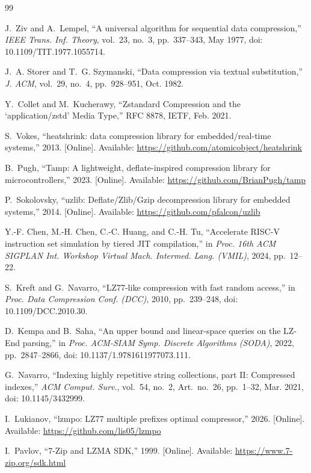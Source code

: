\documentclass[10pt,twocolumn]{article}
\begin{document}
\begin{thebibliography}{99}
\footnotesize
\setlength{\itemsep}{0pt}

J.~Ziv and A.~Lempel, ``A universal algorithm for sequential data compression,''
\emph{IEEE Trans. Inf. Theory}, vol.~23, no.~3, pp.~337--343, May 1977,
doi: 10.1109/TIT.1977.1055714.

J.~A. Storer and T.~G. Szymanski, ``Data compression via textual substitution,''
\emph{J. ACM}, vol.~29, no.~4, pp.~928--951, Oct. 1982.

Y.~Collet and M.~Kucherawy, ``Zstandard Compression and the `application/zstd'
Media Type,'' RFC 8878, IETF, Feb. 2021.

S.~Vokes, ``heatshrink: data compression library for embedded/real-time
systems,'' 2013. [Online]. Available:
\url{https://github.com/atomicobject/heatshrink}

B.~Pugh, ``Tamp: A lightweight, deflate-inspired compression library for
microcontrollers,'' 2023. [Online]. Available:
\url{https://github.com/BrianPugh/tamp}

P.~Sokolovsky, ``uzlib: Deflate/Zlib/Gzip decompression library for embedded
systems,'' 2014. [Online]. Available: \url{https://github.com/pfalcon/uzlib}

Y.-F. Chen, M.-H. Chen, C.-C. Huang, and C.-H. Tu, ``Accelerate RISC-V
instruction set simulation by tiered JIT compilation,'' in \emph{Proc. 16th ACM
SIGPLAN Int. Workshop Virtual Mach. Intermed. Lang. (VMIL)}, 2024, pp.~12--22.

S.~Kreft and G.~Navarro, ``LZ77-like compression with fast random access,'' in
\emph{Proc. Data Compression Conf. (DCC)}, 2010, pp.~239--248,
doi: 10.1109/DCC.2010.30.

D.~Kempa and B.~Saha, ``An upper bound and linear-space queries on the LZ-End
parsing,'' in \emph{Proc. ACM-SIAM Symp. Discrete Algorithms (SODA)}, 2022,
pp.~2847--2866, doi: 10.1137/1.9781611977073.111.

G.~Navarro, ``Indexing highly repetitive string collections, part II:
Compressed indexes,'' \emph{ACM Comput. Surv.}, vol.~54, no.~2, Art.~no.~26,
pp.~1--32, Mar. 2021, doi: 10.1145/3432999.

I.~Lukianov, ``lzmpo: LZ77 multiple prefixes optimal compressor,'' 2026.
[Online]. Available: \url{https://github.com/lis05/lzmpo}

I.~Pavlov, ``7-Zip and LZMA SDK,'' 1999. [Online]. Available:
\url{https://www.7-zip.org/sdk.html}

\end{thebibliography}
\end{document}
